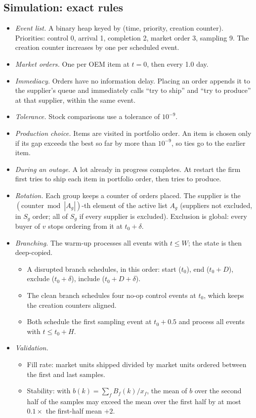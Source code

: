 \documentclass{ifacconf}
\begin{document}
\subsection{Simulation: exact rules}
\begin{itemize}
\item \emph{Event list.} A binary heap keyed by (time, priority, creation counter). Priorities: control 0, arrival 1, completion 2, market order 3, sampling 9. The creation counter increases by one per scheduled event.
\item \emph{Market orders.} One per OEM item at $t=0$, then every 1.0 day.
\item \emph{Immediacy.} Orders have no information delay. Placing an order appends it to the supplier's queue and immediately calls ``try to ship'' and ``try to produce'' at that supplier, within the same event.
\item \emph{Tolerance.} Stock comparisons use a tolerance of $10^{-9}$.
\item \emph{Production choice.} Items are visited in portfolio order. An item is chosen only if its gap exceeds the best so far by more than $10^{-9}$, so ties go to the earlier item.
\item \emph{During an outage.} A lot already in progress completes. At restart the firm first tries to ship each item in portfolio order, then tries to produce.
\item \emph{Rotation.} Each group keeps a counter of orders placed. The supplier is the $(\text{counter} \bmod |A_g|)$-th element of the active list $A_g$ (suppliers not excluded, in $S_g$ order; all of $S_g$ if every supplier is excluded). Exclusion is global: every buyer of $v$ stops ordering from it at $t_0+\delta$.
\item \emph{Branching.} The warm-up processes all events with $t\le W$; the state is then deep-copied.
  \begin{itemize}
  \item A disrupted branch schedules, in this order: start ($t_0$), end ($t_0+D$), exclude ($t_0+\delta$), include ($t_0+D+\delta$).
  \item The clean branch schedules four no-op control events at $t_0$, which keeps the creation counters aligned.
  \item Both schedule the first sampling event at $t_0+0.5$ and process all events with $t\le t_0+H$.
  \end{itemize}
\item \emph{Validation.}
  \begin{itemize}
  \item Fill rate: market units shipped divided by market units ordered between the first and last samples.
  \item Stability: with $b(k)=\sum_f B_f(k)/x_f$, the mean of $b$ over the second half of the samples may exceed the mean over the first half by at most $0.1\times$ the first-half mean $+2$.
  \end{itemize}
\end{itemize}
\end{document}
